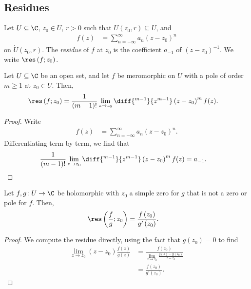 \documentclass[10pt]{mypackage}
\begin{document}
\subsection{Residues}%
\begin{definition}
  Let $U\subseteq \C$, $z_0\in U$, $r > 0$ such that $U\left( z_0,r \right)\subseteq U$, and
  \begin{align*}
    f(z) &= \sum_{n=-\infty}^{\infty} a_n\left( z-z_0 \right)^{n}
  \end{align*}
  on $\dot{U}\left( z_0,r \right)$. The \textit{residue} of $f$ at $z_0$ is the coefficient $a_{-1}$ of $\left( z-z_0 \right)^{-1}$. We write $\res\left( f;z_0 \right)$.
\end{definition}
\begin{proposition}
  Let $U\subseteq \C$ be an open set, and let $f$ be meromorphic on $U$ with a pole of order $m\geq 1$ at $z_0\in U$. Then,
  \begin{align*}
    \res\left( f;z_0 \right) &= \frac{1}{\left( m-1 \right)!} \lim_{z\rightarrow z_0} \diff{^{m-1}}{z^{m-1}} \left( z-z_0 \right)^{m}f(z).
  \end{align*}
\end{proposition}
\begin{proof}
  Write
  \begin{align*}
    f(z) &= \sum_{n=-\infty}^{\infty} a_n\left( z-z_0 \right)^{n}.
  \end{align*}
  Differentiating term by term, we find that
  \begin{align*}
    \frac{1}{\left( m-1 \right)!} \lim_{z\rightarrow z_0} \diff{^{m-1}}{z^{m-1}} \left( z-z_0 \right)^{m}f(z) &= a_{-1}.
  \end{align*}
\end{proof}
\begin{proposition}
  Let $f,g\colon U\rightarrow \C$ be holomorphic with $z_0$ a simple zero for $g$ that is not a zero or pole for $f$. Then,
  \begin{align*}
    \res\left( \frac{f}{g};z_0 \right) &= \frac{f\left(z_0\right)}{g'\left( z_0 \right)}.
  \end{align*}
\end{proposition}
\begin{proof}
  We compute the residue directly, using the fact that $g\left( z_0 \right) = 0$ to find
  \begin{align*}
    \lim_{z\rightarrow z_0} \left( z-z_0 \right) \frac{f(z)}{g(z)} &= \frac{f\left( z_0 \right)}{\lim_{z\rightarrow z_0} \frac{g\left( z \right) - g\left( z_0 \right)}{z-z_0}}\\
                                                                   &= \frac{f\left( z_0 \right)}{g'\left( z_0 \right)}.
  \end{align*}
\end{proof}
\end{document}

